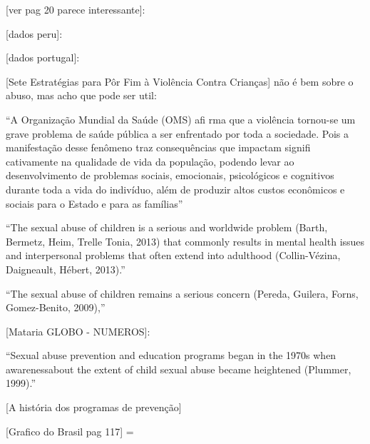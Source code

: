 [ver pag 20 parece interessante]: %

[dados peru]: %

[dados portugal]: %

[Sete Estratégias para Pôr Fim à Violência Contra Crianças] não é bem sobre o abuso, mas acho que pode ser util: %

``A Organização Mundial da Saúde (OMS) afi rma que a violência tornou-se um grave problema de saúde pública a ser enfrentado por toda a sociedade. Pois a manifestação desse fenômeno traz consequências que impactam signifi cativamente na qualidade de vida da população, podendo levar ao desenvolvimento de problemas sociais, emocionais, psicológicos e cognitivos durante toda a vida do indivíduo, além de produzir altos custos econômicos e sociais para o Estado e para as famílias''

``The sexual abuse of children is a serious and worldwide problem (Barth, Bermetz, Heim, Trelle Tonia, 2013) that commonly results in mental health issues and interpersonal problems that  often  extend  into  adulthood  (Collin-Vézina,  Daigneault,  Hébert,  2013).''

``The sexual abuse of children remains a serious concern (Pereda, Guilera, Forns, Gomez-Benito, 2009),''

[Mataria GLOBO - NUMEROS]: %

``Sexual abuse prevention and education programs began in the 1970s when awarenessabout the extent of child sexual abuse became heightened (Plummer, 1999).''

[A história dos programas de prevenção] \cite{plummer1999history}

[Grafico do Brasil pag 117] = %




